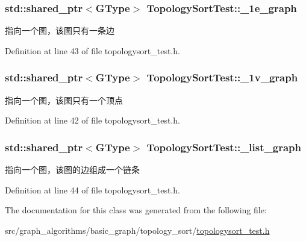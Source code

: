 \subsubsection[{\+\_\+1e\+\_\+graph}]{\setlength{\rightskip}{0pt plus 5cm}std\+::shared\+\_\+ptr$<${\bf G\+Type}$>$ Topology\+Sort\+Test\+::\+\_\+1e\+\_\+graph\hspace{0.3cm}{\ttfamily [protected]}}\label{class_topology_sort_test_af1fe553500cfb175b236a0302d9044af}
指向一个图，该图只有一条边 

Definition at line 43 of file topologysort\+\_\+test.\+h.

\hypertarget{class_topology_sort_test_a087401853f564307534465e2ac59c0ef}{}
\subsubsection[{\+\_\+1v\+\_\+graph}]{\setlength{\rightskip}{0pt plus 5cm}std\+::shared\+\_\+ptr$<${\bf G\+Type}$>$ Topology\+Sort\+Test\+::\+\_\+1v\+\_\+graph\hspace{0.3cm}{\ttfamily [protected]}}\label{class_topology_sort_test_a087401853f564307534465e2ac59c0ef}
指向一个图，该图只有一个顶点 

Definition at line 42 of file topologysort\+\_\+test.\+h.

\hypertarget{class_topology_sort_test_ac664dd33d2aa257a993c1835caa0d5ad}{}
\subsubsection[{\+\_\+list\+\_\+graph}]{\setlength{\rightskip}{0pt plus 5cm}std\+::shared\+\_\+ptr$<${\bf G\+Type}$>$ Topology\+Sort\+Test\+::\+\_\+list\+\_\+graph\hspace{0.3cm}{\ttfamily [protected]}}\label{class_topology_sort_test_ac664dd33d2aa257a993c1835caa0d5ad}
指向一个图，该图的边组成一个链条 

Definition at line 44 of file topologysort\+\_\+test.\+h.



The documentation for this class was generated from the following file\+:\begin{DoxyCompactItemize}
\item 
src/graph\+\_\+algorithms/basic\+\_\+graph/topology\+\_\+sort/\hyperlink{topologysort__test_8h}{topologysort\+\_\+test.\+h}\end{DoxyCompactItemize}
